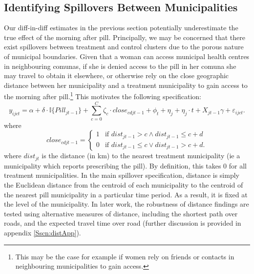 \subsection{Identifying Spillovers Between Municipalities}
\label{TEENsscn:spilloverID}
Our diff-in-diff estimates in the previous section potentially underestimate the 
true effect of the morning after pill.  Principally, we may be concerned that
there exist spillovers between treatment and control clusters due to the porous
nature of municipal boundaries. Given that a woman can access municipal health
centres in neighbouring comunas, if she is denied access to the pill in her
comuna she may travel to obtain it elsewhere, or otherwise rely on the close
geographic distance between her municipality and a treatment municipality to 
gain access to the morning after pill.\footnote{This may be the case for example
if women rely on friends or contacts in neighbouring municipalities to gain 
access.}  This motivates the following specification:
\begin{equation}
 \label{TEENeqn:spillover}
y_{ijct} = \alpha + \delta\cdot \mathbb{I}\{Pill_{jt-1}\} + 
\sum_{c=0}^C\zeta_c\cdot close_{cdjt-1} + \phi_t + \eta_j + \eta_j\cdot t +
X_{jt-1}\gamma + \varepsilon_{ijct}.
\end{equation}
where
\[
 close_{cdjt-1} =
  \begin{cases}
   1 & \text{if } dist_{jt-1} > c \wedge dist_{jt-1}\leq c+d   \\
   0 & \text{if } dist_{jt-1} \leq c \vee  dist_{jt-1}>c+d.
  \end{cases}
\]
where $dist_{jt}$ is the distance (in km) to the nearest treatment municipality 
(ie a municipality which reports prescribing the pill).  By definition, this takes
0 for all treatment municipalities.  In the main spillover specification, distance
is simply the Euclidean distance from the centroid of each municipality to the 
centroid of the nearest pill municipality in a particular time period.  As a result, 
it is fixed at the level of the municipality.  In later work, the robustness of 
distance findings are tested using alternative measures of distance, including the
shortest path over roads, and the expected travel time over road (further 
discussion is provided in appendix \ref{Sscn:distApp}).

